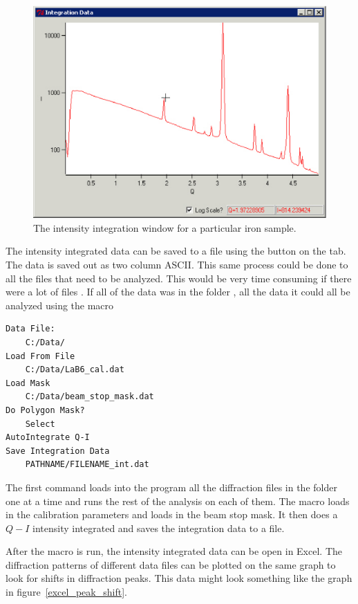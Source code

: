 \begin{figure}
    \centering
    \includegraphics[scale=.75]
    {figures/iron_intensity.eps}
    \caption{The intensity integration window for 
    a particular iron sample.}
    \label{iron_intensity}
\end{figure}

The intensity integrated data can be saved to a file
using the  button on the  tab. 
The data is saved out as two column ASCII. This same 
process could be done to all the files that need to be 
analyzed. This would be very time consuming if there were a lot of files . 
If all of the data was in the folder , all the data 
it could all be analyzed using the macro
\begin{lstlisting}[caption={'macro.dat'}]
Data File:
	C:/Data/
Load From File
    C:/Data/LaB6_cal.dat
Load Mask
    C:/Data/beam_stop_mask.dat
Do Polygon Mask?
    Select
AutoIntegrate Q-I
Save Integration Data
    PATHNAME/FILENAME_int.dat
\end{lstlisting}
The first command loads into the program all the
diffraction files in the folder 
one at a time and runs the rest of the analysis on
each of them. The macro loads in the calibration parameters
and loads in the beam stop 
mask. It then does a $Q-I$ intensity integrated and 
saves the integration data to a file. 

After the macro is run, the intensity integrated data can be open 
in Excel. 
The diffraction patterns of different data files can be plotted on
the same graph to look for shifts in diffraction peaks. 
This data might look something like the graph 
in figure~\ref{excel_peak_shift}.

